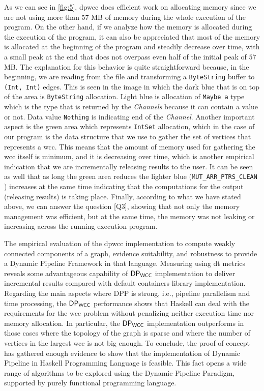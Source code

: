 As we can see in \autoref{fig:5}, \acrshort{dpwcc} does efficient work on allocating memory since we are not using more than $57$ MB of memory during the whole execution of the program.
On the other hand, if we analyze how the memory is allocated during the execution of the program, it can also be appreciated that most of the memory is allocated at the beginning of the program and steadily decrease over time, with a small peak at the end that does not overpass even half of the initial peak of $57$ MB. 
The explanation for this behavior is quite straightforward because, in the beginning, we are reading from the file and transforming a \texttt{ByteString} buffer to \texttt{(Int, Int)} edges. 
This is seen in the image in which the dark blue that is on top of the area is \texttt{ByteString} allocation. 
Light blue is allocation of \texttt{Maybe a} type which is the type that is returned by the \textit{Channels} because it can contain a value or not. 
Data value \texttt{Nothing} is indicating end of the \textit{Channel}. 
Another important aspect is the green area which represents \texttt{IntSet} allocation, which in the case of our program is the data structure that we use to gather the set of vertices that represents a \acrshort{wcc}. 
This means that the amount of memory used for gathering the \acrshort{wcc} itself is minimum, and it is decreasing over time, which is another empirical indication that we are incrementally releasing results to the user. 
It can be seen as well that as long the green area reduces the lighter blue (\texttt{MUT_ARR_PTRS_CLEAN} \cite{ghcheap}) increases at the same time indicating that the computations for the output (releasing results) is taking place. 
Finally, according to what we have stated above, we can answer the question [Q3], showing that not only the memory management was efficient, but at the same time, the memory was not leaking or increasing across the running execution program.

The empirical evaluation of the \acrshort{dpwcc} implementation to compute weakly connected components of a graph, evidence suitability, 
and robustness to provide a Dynamic Pipeline Framework in that language. Measuring using \acrshort{dt} metrics reveals some advantageous capability of $\mathsf{DP_{WCC}}$ implementation to deliver incremental results compared with default containers library implementation. 
Regarding the main aspects where DPP is strong, i.e., pipeline parallelism and time processing, the $\mathsf{DP_{WCC}}$ performance shows that Haskell 
can deal with the requirements for the \acrshort{wcc} problem without penalizing neither execution time nor memory allocation. 
In particular, the $\mathsf{DP_{WCC}}$ implementation outperforms in those cases where the topology of the graph is sparse and where the number of vertices in the largest \acrshort{wcc} is not big enough. 
To conclude, the proof of concept has gathered enough evidence to show that the implementation of Dynamic Pipeline in Haskell Programming Language is feasible. 
This fact opens a wide range of algorithms to be explored using the Dynamic Pipeline Paradigm, supported by purely functional programming language.

